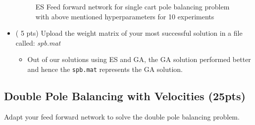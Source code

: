 \documentclass{article}
\begin{document}
\begin{itemize}
\begin{figure}[htpb]
            \caption{ES Feed forward network for single cart pole balancing problem with above mentioned hyperparameters for 10 experiments}
            \label{fig:name}
        \end{figure}
	\item ( 5 pts) Upload the weight matrix of your most successful solution in a file called: \textit{spb.mat}
	\begin{itemize}
	\color{blue}
	\item Out of our solutions using ES and GA, the GA solution performed better and hence the \texttt{spb.mat} represents the GA solution.
	\color{black} 
	\end{itemize}
\end{itemize}

\newpage
\subsection{Double Pole Balancing with Velocities (25pts)}
Adapt your feed forward network to solve the double pole balancing problem.
\end{document}
